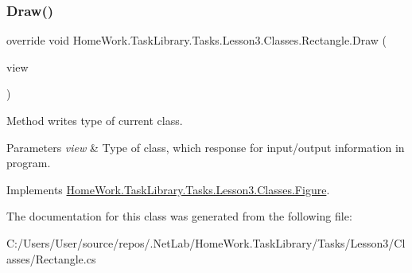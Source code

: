 \subsubsection{\texorpdfstring{Draw()}{Draw()}}
{\footnotesize\ttfamily override void Home\+Work.\+Task\+Library.\+Tasks.\+Lesson3.\+Classes.\+Rectangle.\+Draw (\begin{DoxyParamCaption}\item[{I\+Information}]{view }\end{DoxyParamCaption})\hspace{0.3cm}{\ttfamily [virtual]}}



Method writes type of current class. 


\begin{DoxyParams}{Parameters}
{\em view} & Type of class, which response for input/output information in program.\\
\hline
\end{DoxyParams}


Implements \mbox{\hyperlink{class_home_work_1_1_task_library_1_1_tasks_1_1_lesson3_1_1_classes_1_1_figure_acf9c70a78ffb35ca60f070ded3033391}{Home\+Work.\+Task\+Library.\+Tasks.\+Lesson3.\+Classes.\+Figure}}.



The documentation for this class was generated from the following file\+:\begin{DoxyCompactItemize}
\item 
C\+:/\+Users/\+User/source/repos/.\+Net\+Lab/\+Home\+Work.\+Task\+Library/\+Tasks/\+Lesson3/\+Classes/Rectangle.\+cs\end{DoxyCompactItemize}
